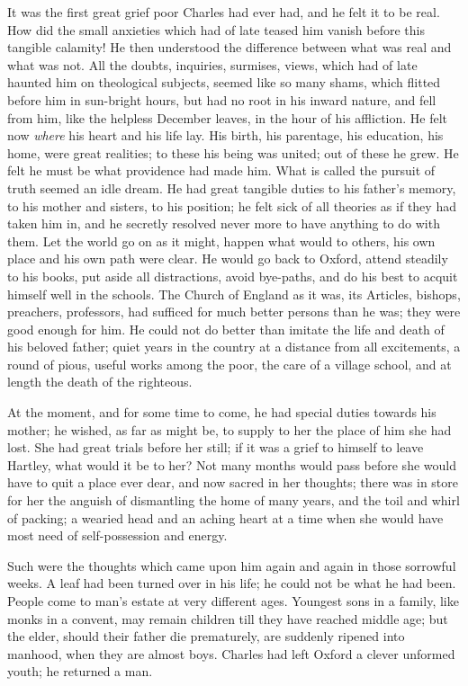 It was the first great grief poor Charles had ever had, and he felt
it to be real. How did the small anxieties which had of late teased
him vanish before this tangible calamity! He then understood the
difference between what was real and what was not. All the doubts,
inquiries, surmises, views, which had of late haunted him on
theological subjects, seemed like so many shams, which flitted before
him in sun-bright hours, but had no root in his inward nature, and
fell from him, like the helpless December leaves, in the hour of his
affliction. He felt now \emph{where} his heart and his life lay. His
birth, his parentage, his education, his home, were great realities;
to these his being was united; out of these he grew. He felt he must
be what providence had made him. What is called the pursuit of truth
seemed an idle dream. He had great tangible duties to his father's
memory, to his mother and sisters, to his position; he felt sick of
all theories as if they had taken him in, and he secretly
resolved never more to have anything to do with them. Let the world go
on as it might, happen what would to others, his own place and his own
path were clear. He would go back to Oxford, attend steadily to his
books, put aside all distractions, avoid bye-paths, and do his best to
acquit himself well in the schools. The Church of England as it was,
its Articles, bishops, preachers, professors, had sufficed for much
better persons than he was; they were good enough for him. He could
not do better than imitate the life and death of his beloved father;
quiet years in the country at a distance from all excitements, a round
of pious, useful works among the poor, the care of a village school,
and at length the death of the righteous.

At the moment, and for some time to come, he had special duties
towards his mother; he wished, as far as might be, to supply to her
the place of him she had lost. She had great trials before her still;
if it was a grief to himself to leave Hartley, what would it be to
her? Not many months would pass before she would have to quit a place
ever dear, and now sacred in her thoughts; there was in store for her
the anguish of dismantling the home of many years, and the toil and
whirl of packing; a wearied head and an aching heart at a time when
she would have most need of self-possession and energy.

Such were the thoughts which came upon him again and again in those
sorrowful weeks. A leaf had been turned over in his life; he could not
be what he had been. People come to man's estate at very different
ages. Youngest sons in a family, like monks in a convent, may
remain children till they have reached middle age; but the elder,
should their father die prematurely, are suddenly ripened into
manhood, when they are almost boys. Charles had left Oxford a clever
unformed youth; he returned a man.

